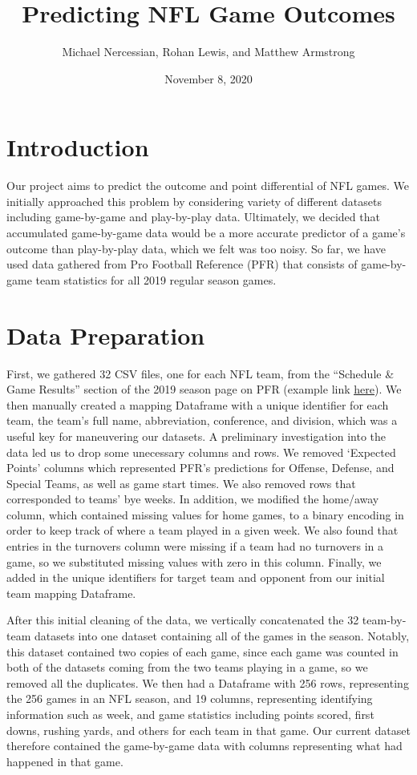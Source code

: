 \documentclass{article}
\title{Predicting NFL Game Outcomes}
\author{Michael Nercessian, Rohan Lewis, and Matthew Armstrong}
\date{November 8, 2020}
\begin{document}
\maketitle

\section{Introduction}
Our project aims to predict the outcome and point differential of NFL games. We initially approached this problem by considering variety of different datasets including game-by-game and play-by-play data. Ultimately, we decided that accumulated game-by-game data would be a more accurate predictor of a game’s outcome than play-by-play data, which we felt was too noisy. So far, we have used data gathered from Pro Football Reference (PFR) that consists of game-by-game team statistics for all 2019 regular season games. 

\section{Data Preparation}
First, we gathered 32 CSV files, one for each NFL team, from the “Schedule & Game Results” section of the 2019 season page on PFR (example link \href{https://www.pro-football-reference.com/teams/buf/2019.htm}{\underline{here}}).
We then manually created a mapping Dataframe with a unique identifier for each team, the team’s full name, abbreviation, conference, and division, which was a useful key for maneuvering our datasets. 
A preliminary investigation into the data led us to drop some unecessary columns and rows. We removed ‘Expected Points’ columns which represented PFR’s predictions for Offense, Defense, and Special Teams, as well as game start times. We also removed rows that corresponded to teams' bye weeks. In addition, we modified the home/away column, which contained missing values for home games, to a binary encoding in order to keep track of where a team played in a given week. We also found that entries in the turnovers column were missing if a team had no turnovers in a game, so we substituted missing values with zero in this column. Finally, we added in the unique identifiers for target team and opponent from our initial team mapping Dataframe.

After this initial cleaning of the data, we vertically concatenated the 32 team-by-team datasets into one dataset containing all of the games in the season. Notably, this dataset contained two copies of each game, since each game was counted in both of the datasets coming from the two teams playing in a game, so we removed all the duplicates. We then had a Dataframe with 256 rows, representing the 256 games in an NFL season, and 19 columns, representing identifying information such as week, and game statistics including points scored, first downs, rushing yards, and others for each team in that game. Our current dataset therefore contained the game-by-game data with columns representing what had happened in that game.
\end{document}
